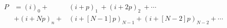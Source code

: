 \documentclass[preview]{standalone}
\begin{document}
\begin{align*}
P &= (i)_0+&(i+p)_1\:+(i+2p)_2\:+\cdots\\&+(i+Np)_n+&(i+[N-1]p)_{N-1}+(i+[N-2]p)_{N-2}+\cdots
\end{align*}
\end{document}
